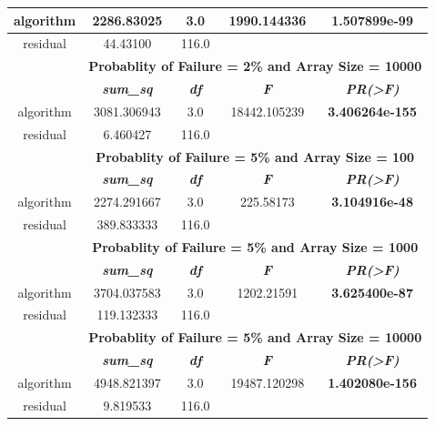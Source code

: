 \begin{table}[H]
\begin{center}
\begin{tabular}{|c|c|c|c|c|}
    \hline
    algorithm & 2286.83025 & 3.0 & 1990.144336 & \textbf{1.507899e-99} \\
    \hline
    residual & 44.43100 & 116.0 & & \\
    \hline
    \multirow{2}{*}{\hfill}&\multicolumn{4}{|c|}{\textbf{Probablity of Failure = 2\% and Array Size = 10000}} \\
    \cline{2-5}
    &\textbf{\textit{sum\_sq}} & \textbf{\textit{df}} & \textbf{\textit{F}} & \textbf{\textit{PR(>F)}} \\
    \hline
    algorithm & 3081.306943 & 3.0 & 18442.105239 & \textbf{3.406264e-155} \\
    \hline
    residual & 6.460427 & 116.0 & & \\
    \hline
    \multirow{2}{*}{\hfill}&\multicolumn{4}{|c|}{\textbf{Probablity of Failure = 5\% and Array Size = 100}} \\
    \cline{2-5}
    &\textbf{\textit{sum\_sq}} & \textbf{\textit{df}} & \textbf{\textit{F}} & \textbf{\textit{PR(>F)}} \\
    \hline
    algorithm & 2274.291667 & 3.0 & 225.58173 & \textbf{3.104916e-48} \\
    \hline
    residual & 389.833333 & 116.0 & & \\
    \hline
    \multirow{2}{*}{\hfill}&\multicolumn{4}{|c|}{\textbf{Probablity of Failure = 5\% and Array Size = 1000}} \\
    \cline{2-5}
    &\textbf{\textit{sum\_sq}} & \textbf{\textit{df}} & \textbf{\textit{F}} & \textbf{\textit{PR(>F)}} \\
    \hline
    algorithm & 3704.037583 & 3.0 & 1202.21591 & \textbf{3.625400e-87} \\
    \hline
    residual & 119.132333 & 116.0 & & \\
    \hline
    \multirow{2}{*}{\hfill}&\multicolumn{4}{|c|}{\textbf{Probablity of Failure = 5\% and Array Size = 10000}} \\
    \cline{2-5}
    &\textbf{\textit{sum\_sq}} & \textbf{\textit{df}} & \textbf{\textit{F}} & \textbf{\textit{PR(>F)}} \\
    \hline
    algorithm & 4948.821397 & 3.0 & 19487.120298 & \textbf{1.402080e-156} \\
    \hline
    residual & 9.819533 & 116.0 & & \\
    \hline
    \end{tabular}
    \label{tab-hypothesis1-testing}
    \end{center}
\end{table}

